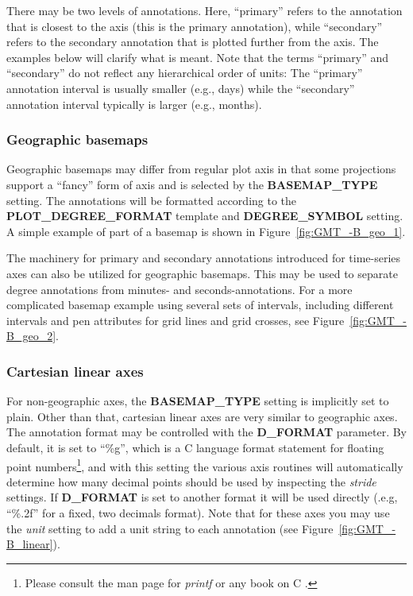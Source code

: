 There may be two levels of annotations.  Here, ``primary'' refers to the annotation
that is closest to the axis (this is the primary annotation), while ``secondary'' refers to the secondary
annotation that is plotted further from the axis.  The examples below
will clarify what is meant.  Note that the terms ``primary'' and ``secondary'' do not reflect any hierarchical
order of units: The ``primary'' annotation interval is usually smaller (e.g., days) while the
``secondary'' annotation interval typically is larger (e.g., months).

\subsubsection{Geographic basemaps}

Geographic basemaps may differ from regular plot axis in that some projections support a
``fancy'' form of axis and is selected by the \textbf{BASEMAP\_TYPE} setting.  The annotations
will be formatted according to the \textbf{PLOT\_DEGREE\_FORMAT} template and \textbf{DEGREE\_SYMBOL}
setting.  A simple example of part of a basemap is shown in Figure~\ref{fig:GMT_-B_geo_1}.


The machinery for primary and secondary annotations introduced for time-series axes can
also be utilized for geographic basemaps.  This may be used to separate
degree annotations from minutes- and seconds-annotations.  For a more complicated basemap
example using several sets of intervals, including different intervals and pen attributes
for grid lines and grid crosses, see Figure~\ref{fig:GMT_-B_geo_2}.



\subsubsection{Cartesian linear axes}

For non-geographic axes, the \textbf{BASEMAP\_TYPE} setting is implicitly set to plain.  Other than that,
cartesian linear axes are very similar to geographic axes.  The annotation format may be controlled with
the \textbf{D\_FORMAT} parameter.  By default, it is set to ``\%g'', which is a C language format statement
for floating point numbers\footnote{Please consult the man page for \emph{printf} or any book on C .},
and with this setting the various axis routines will automatically determine
how many decimal points should be used by inspecting the \emph{stride} settings.  If \textbf{D\_FORMAT} is set
to another format it will be used directly (.e.g, ``\%.2f'' for a fixed, two decimals format).
Note that for these axes you may use the \emph{unit} setting to
add a unit string to each annotation (see Figure~\ref{fig:GMT_-B_linear}).

